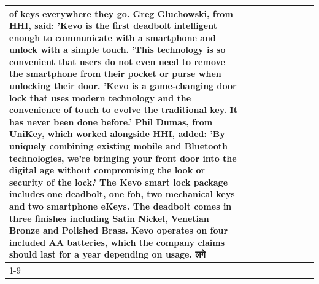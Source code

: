 \begin{table}[H]
\begin{tabular}{lllrlllll}
of keys everywhere they go. Greg Gluchowski, from HHI, said: 'Kevo is the first deadbolt intelligent enough to communicate with a smartphone and unlock with a simple touch. 'This technology is so convenient that users do not even need to remove the smartphone from their pocket or purse when unlocking their door. 'Kevo is a game-changing door lock that uses modern technology and the convenience of touch to evolve the traditional key. It has never been done before.' Phil Dumas, from UniKey, which worked alongside HHI, added: 'By uniquely combining existing mobile and Bluetooth technologies, we’re bringing your front door into the digital age without compromising the look or security of the lock.' The Kevo smart lock package includes one deadbolt, one fob, two mechanical keys and two smartphone eKeys. The deadbolt comes in three finishes including Satin Nickel, Venetian Bronze and Polished Brass. Kevo operates on four included AA batteries, which the company claims should last for a year depending on usage. लगे \\
\cline{1-9}

\end{tabular}
\end{table}
